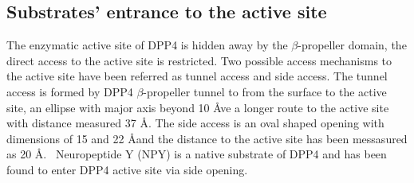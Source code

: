 \subsection{Substrates' entrance to the active site}

The enzymatic active site of DPP4 is hidden away by the $\beta$-propeller domain, the direct access to the active site is restricted. Two possible access mechanisms to the active site have been referred as tunnel access and side access. The tunnel access is formed by DPP4 $\beta$-propeller  tunnel to from the surface to the active site, an ellipse with major axis beyond 10 \AA ve a longer route to the active site with distance measured 37 \AA. The side access is an oval shaped opening with dimensions of 15 and 22 \AA and the distance to the active site has been messasured as 20 \AA.~\cite{Engel_2003, Rasmussen_2002,Weihofen_2004} Neuropeptide Y (NPY) is a native substrate of DPP4 and has been found to enter DPP4 active site via side opening. ~\cite{Aertgeerts_2004}